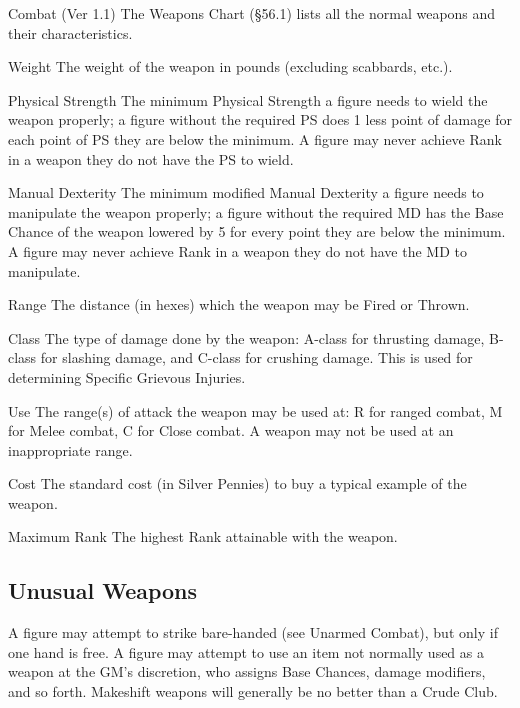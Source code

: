 \begin{Chapter}{Combat (Ver 1.1)}
The Weapons Chart (§56.1) lists all the normal weapons and their
characteristics.

Weight The weight of the weapon in pounds (excluding scabbards,
etc.).

\begin{Description}

\item[Physical Strength] The minimum Physical Strength a figure needs
  to wield the weapon properly; a figure without the required PS does
  1 less point of damage for each point of PS they are below the
  minimum.  A figure may never achieve Rank in a weapon they do not
  have the PS to wield.

\item[Manual Dexterity] The minimum modified Manual Dexterity a figure
  needs to manipulate the weapon properly; a figure without the
  required MD has the Base Chance of the weapon lowered by 5 for every
  point they are below the minimum.  A figure may never achieve Rank
  in a weapon they do not have the MD to manipulate.

\item[Range] The distance (in hexes) which the weapon may be Fired or
  Thrown.

\item[Class] The type of damage done by the weapon: A-class for
  thrusting damage, B-class for slashing damage, and C-class for
  crushing damage.  This is used for determining Specific Grievous
  Injuries.

\item[Use] The range(s) of attack the weapon may be used at: R for
  ranged combat, M for Melee combat, C for Close combat. A weapon may
  not be used at an inappropriate range.

\item[Cost] The standard cost (in Silver Pennies) to buy a typical
  example of the weapon.

\item[Maximum] Rank The highest Rank attainable with the weapon.

\end{Description}
  
\subsection{Unusual Weapons}

A figure may attempt to strike bare-handed (see Unarmed Combat), but
only if one hand is free.  A figure may attempt to use an item not
normally used as a weapon at the GM’s discretion, who assigns Base
Chances, damage modifiers, and so forth.  Makeshift weapons will
generally be no better than a Crude Club.


\end{Chapter}
